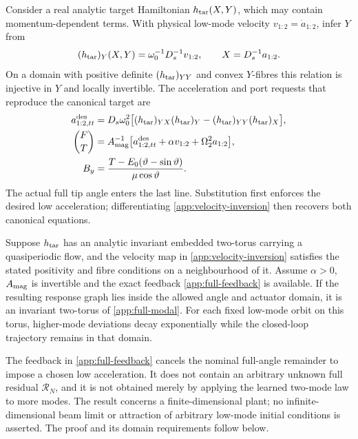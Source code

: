 Consider a real analytic target Hamiltonian $h_{\rm tar}(X,Y)$, which may
contain momentum-dependent terms. With physical low-mode velocity
$v_{1:2}=\dot a_{1:2}$, infer $Y$ from
\begin{equation}
 (h_{\rm tar})_Y(X,Y)=\omega_0^{-1}D_s^{-1}v_{1:2},
 \qquad X=D_s^{-1}a_{1:2}.
 \label{app:velocity-inversion}
\end{equation}
On a domain with positive definite $(h_{\rm tar})_{YY}$ and convex
$Y$-fibres this relation is injective in $Y$ and locally invertible.
The acceleration and port requests that reproduce the canonical target
are
\begin{align}
 a^{\rm des}_{1:2,tt}
 &=D_s\omega_0^2\bigl[
     (h_{\rm tar})_{YX}(h_{\rm tar})_Y
       -(h_{\rm tar})_{YY}(h_{\rm tar})_X\bigr],\nonumber\\
 \binom{F}{T}
 &=A_{\rm mag}^{-1}
   \bigl[a^{\rm des}_{1:2,tt}+\alpha v_{1:2}
                        +\Omega_2^2a_{1:2}\bigr],\nonumber\\
 B_y&=\frac{T-E_0(\vartheta-\sin\vartheta)}{\mu\cos\vartheta}.
 \label{app:full-feedback}
\end{align}
The actual full tip angle enters the last line. Substitution first
enforces the desired low acceleration; differentiating
\eqref{app:velocity-inversion} then recovers both canonical equations.

\begin{proposition}
\label{app:conditional-lift}
Suppose $h_{\rm tar}$ has an analytic invariant embedded two-torus
carrying a quasiperiodic flow, and the
velocity map in \eqref{app:velocity-inversion} satisfies the stated
positivity and fibre conditions on a neighbourhood of it. Assume
$\alpha>0$, $A_{\rm mag}$ is invertible and the exact feedback
\eqref{app:full-feedback} is available. If the resulting response graph
lies inside the allowed angle and actuator domain, it is an invariant
two-torus of \eqref{app:full-modal}. For each fixed low-mode orbit on
this torus, higher-mode deviations decay exponentially while the
closed-loop trajectory remains in that domain.
\end{proposition}


The feedback in \eqref{app:full-feedback} cancels the nominal full-angle
remainder to impose a chosen low acceleration. It does not contain an
arbitrary unknown full residual $\mathcal R_N$, and it is not obtained
merely by applying the learned two-mode law to more modes. The result
concerns a finite-dimensional plant; no infinite-dimensional beam
limit or attraction of arbitrary low-mode initial conditions is
asserted. The proof and its domain requirements follow below.

